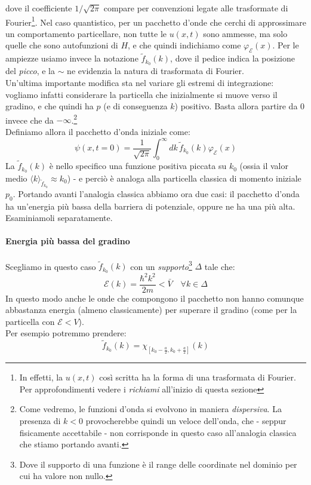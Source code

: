 \documentclass[../../FisicaTeorica.tex]{subfiles}
\begin{document}
dove il coefficiente $1/\sqrt{2\pi}$ compare per convenzioni legate alle trasformate di Fourier\footnote{In effetti, la $u(x,t)$ così scritta ha la forma di una trasformata di Fourier. Per approfondimenti vedere i \textit{richiami} all'inizio di questa sezione}. 
Nel caso quantistico, per un pacchetto d'onde che cerchi di approssimare un comportamento particellare, non tutte le $u(x,t)$ sono ammesse, ma solo quelle che sono autofunzioni di $H$, e che quindi indichiamo come $\varphi_{\mathcal{E}}(x)$. Per le ampiezze usiamo invece la notazione $\tilde{f}_{k_0}(k)$, dove il pedice indica la posizione del \textit{picco}, e la $\sim$ ne evidenzia la natura di trasformata di Fourier.\\
Un'ultima importante modifica sta nel variare gli estremi di integrazione: vogliamo infatti considerare la particella che inizialmente si muove verso il gradino, e che quindi ha $p$ (e di conseguenza $k$) positivo. Basta allora partire da $0$ invece che da $-\infty$.\footnote{Come vedremo, le funzioni d'onda si evolvono in maniera \textit{dispersiva}. La presenza di $k<0$ provocherebbe quindi un veloce  dell'onda, che - seppur fisicamente accettabile - non corrisponde in questo caso all'analogia classica che stiamo portando avanti.}\\
Definiamo allora il pacchetto d'onda iniziale come:
\begin{equation}
\psi(x,t=0)=\frac{1}{\sqrt{2\pi}}\int_0^{\infty} dk\,\tilde{f}_{k_0}(k) \varphi_\mathcal{E}(x)
\label{eqn:pacchettoiniziale}
\end{equation}
La $\tilde{f}_{k_0}(k)$ è nello specifico una funzione positiva piccata su $k_0$ (ossia il valor medio $\langle k\rangle_{\tilde{f}_{k_0}}\approx k_0$) - e perciò è analoga alla particella classica di momento iniziale $p_0$. Portando avanti l'analogia classica abbiamo ora due casi: il pacchetto d'onda ha  un'energia più bassa della barriera di potenziale, oppure ne ha una più alta. Esaminiamoli separatamente.
\paragraph{Energia più bassa del gradino}
Scegliamo in questo caso $\tilde{f}_{k_0}(k)$ con un \textit{supporto}\footnote{Dove il supporto di una funzione  è il range delle coordinate nel dominio per cui ha valore non nullo.} $\Delta$ tale che:
\[
\mathcal{E}(k) =
\frac{\hbar^2 k^2}{2m}<\bar{V} \quad \forall k\in \Delta
\]
In questo modo anche le onde  che compongono il pacchetto non hanno comunque abbastanza energia (almeno classicamente) per superare il gradino (come per la particella con $\mathcal{E}<V$).\\
Per esempio potremmo prendere:
\[
\tilde{f}_{k_0}(k)=\chi_{\left[k_0-\frac{a}{2}, k_0+\frac{a}{2}\right]}(k)
\]
\end{document}
